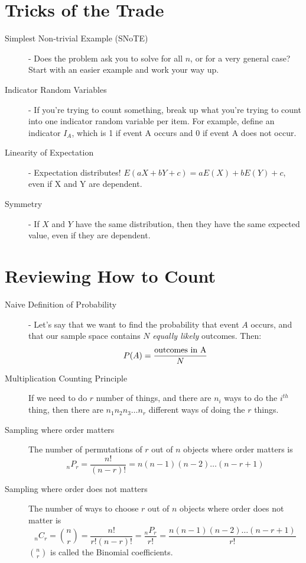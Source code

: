 \documentclass[11pt]{article}
\begin{document}
\section*{Tricks of the Trade}
\begin{description}
\item[Simplest Non-trivial Example (SNoTE)] - Does the problem ask you to solve for all $n$, or for a very general case? Start with an easier example and work your way up.
\item[Indicator Random Variables] - If you're trying to count something, break up what you're trying to count into one indicator random variable per item. For example, define an indicator $I_A$, which is 1 if event A occurs and 0 if event A does not occur.
\item[Linearity of Expectation] - Expectation distributes! $E(aX + bY + c) = aE(X) + bE(Y) + c$, even if X and Y are dependent.
\item[Symmetry] - If $X$ and $Y$ have the same distribution, then they have the same expected value, even if they are dependent.
\end{description}

\section*{Reviewing How to Count}
\begin{description}
\item[Naive Definition of Probability] - Let's say that we want to find the probability that event $A$ occurs, and that our sample space contains $N$ \emph{equally likely} outcomes. Then:
\[P(A) = \frac{\textnormal{outcomes in A}}{N} \]
\item[Multiplication Counting Principle] If we need to do $r$ number of things, and there are $n_i$ ways to do the $i^{th}$ thing, then there are $n_1n_2n_3 \dots n_r$ different ways of doing the $r$ things.

\item[Sampling where order matters] The number of permutations of $r$ out of $n$ objects where order matters is
\[_nP_r = \frac{n!}{(n-r)!} = n(n-1)(n-2) \dots (n-r+1)\]
\item[Sampling where order does not matters] The number of ways to choose $r$ out of $n$ objects where order does not matter is
\[_nC_r = {n \choose r} = \frac{n!}{r!(n-r)!} =  \frac{_nP_r}{r!} = \frac{n(n-1)(n-2) \dots (n-r+1)}{r!}\]
${n \choose r}$ is called the Binomial coefficients.

\end{description}
\end{document}
